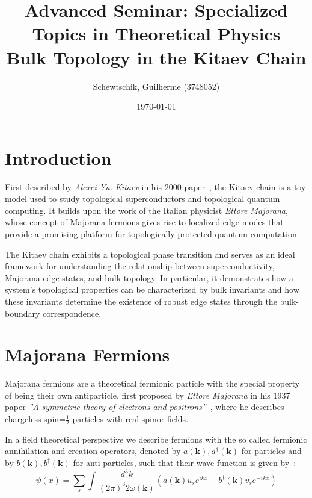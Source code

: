 \documentclass[11pt, a4paper]{article}
\title{Advanced Seminar: Specialized Topics in Theoretical Physics \\[1ex] \large \textbf{Bulk Topology in the Kitaev Chain}}
\author{Schewtschik, Guilherme (3748052)}
\date{\today}
\numberwithin{equation}{section}
\begin{document}
\maketitle



\section{Introduction}

First described by \textit{Alexei Yu. Kitaev} in his 2000 paper~\cite{Kitaev2000}, the Kitaev chain is a toy model used to study topological superconductors and topological quantum computing. It builds upon the work of the Italian physicist \textit{Ettore Majorana}, whose concept of Majorana fermions gives rise to localized edge modes that provide a promising platform for topologically protected quantum computation.

The Kitaev chain exhibits a topological phase transition and serves as an ideal framework for understanding the relationship between superconductivity, Majorana edge states, and bulk topology. In particular, it demonstrates how a system's topological properties can be characterized by bulk invariants and how these invariants determine the existence of robust edge states through the bulk-boundary correspondence.



\section{Majorana Fermions}\label{sec:Majorana}
Majorana fermions are a theoretical fermionic particle with the special property of being their own antiparticle,
first proposed by  \textit{Ettore Majorana} in his 1937 paper \textit{''A symmetric theory of electrons and positrons''}~\cite{Majorana1937},
where he describes chargeless spin=$\frac{1}{2}$ particles with real spinor fields.

In a field theoretical perspective we describe fermions with the so called fermionic annihilation and creation operators, denoted by $a(\mathbf{k}),a^\dagger(\mathbf{k})$ for particles and by $b(\mathbf{k}),b^\dagger(\mathbf{k})$ for anti-particles, such that their wave function is given by~\cite{Srednicki2007}:
\begin{equation}
    \psi(x) = \sum_{s} \int \frac{d^3k}{(2 \pi )^3 2\omega(\mathbf{k})} \left( a(\mathbf{k})u_s e^{ikx} + b^\dagger(\mathbf{k}) v_s e^{-ikx}\right)
    \label{eq:canonical_quantization_fermion}
\end{equation}
\end{document}

